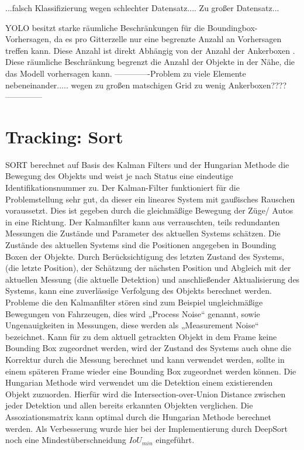 \documentclass[conference]{IEEEtran}
\begin{document}
	...falsch Klassifizierung wegen schlechter Datensatz....
	Zu großer Datensatz...
	
	YOLO besitzt starke räumliche Beschränkungen für die Boundingbox-Vorhersagen, da es pro Gitterzelle nur eine begrenzte Anzahl an Vorhersagen treffen kann. Diese Anzahl ist direkt Abhängig von der Anzahl der Ankerboxen \cite{b3}. Diese räumliche Beschränkung begrenzt die Anzahl der Objekte in der Nähe, die das Modell vorhersagen kann. 
	-------------Problem zu viele Elemente nebeneinander..... wegen zu großen matschigen Grid zu wenig Ankerboxen????--------------

	\section{Tracking: Sort}
	SORT berechnet auf Basis des Kalman Filters und der Hungarian Methode die Bewegung des Objekts und weist je nach Status eine eindeutige Identifikationsnummer zu. Der Kalman-Filter funktioniert für die Problemstellung sehr gut, da dieser ein lineares System mit gaußisches Rauschen voraussetzt. Dies ist gegeben durch die gleichmäßige Bewegung der Züge/ Autos in eine Richtung.
	Der Kalmanfilter kann aus verrauschten, teils redundanten Messungen die Zustände und Parameter des aktuellen Systems schätzen. Die Zustände des aktuellen Systems sind die Positionen angegeben in Bounding Boxen der Objekte. Durch Berücksichtigung des letzten Zustand des Systems, (die letzte Position), der Schätzung der nächsten Position und Abgleich mit der aktuellen Messung (die aktuelle Detektion) und anschließender Aktualisierung des Systems, kann eine zuverlässige Verfolgung des Objekts berechnet werden. Probleme die den Kalmanfilter stören sind zum Beispiel ungleichmäßige Bewegungen von Fahrzeugen, dies wird „Process Noise“ genannt, sowie Ungenauigkeiten in Messungen, diese werden als „Measurement Noise“ bezeichnet.
	Kann für zu dem aktuell getrackten Objekt in dem Frame keine Bounding Box zugeordnet werden, wird der Zustand des Systems auch ohne die Korrektur durch die Messung berechnet und kann verwendet werden, sollte in einem späteren Frame wieder eine Bounding Box zugeordnet werden können. 
	Die Hungarian Methode wird verwendet um die Detektion einem existierenden Objekt zuzuorden. Hierfür wird die Intersection-over-Union Distance zwischen jeder Detektion und allen bereits erkannten Objekten verglichen. Die Assoziationsmatrix kann optimal durch die Hungarian Methode berechnet werden. Als Verbesserung wurde hier bei der Implementierung durch DeepSort noch eine Mindestüberschneidung $IoU_{min}$ eingeführt.
	
\end{document}
